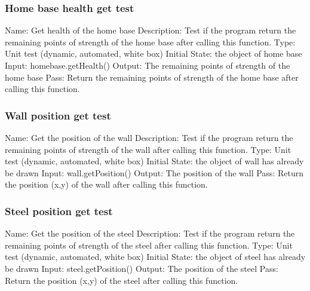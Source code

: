 \documentclass{article}
\begin{document}
\subsubsection{Home base health get test}
Name:  Get health of the home base\newline
Description: Test if the program return the remaining points of strength of the home base after calling this function. \newline
Type: Unit test (dynamic, automated, white box) \newline
Initial State:  the object of home base\newline
Input: homebase.getHealth()\newline
Output: The remaining points of strength of the home base\newline
Pass:  Return the remaining points of strength of the home base after calling this function. \newline

\subsubsection{Wall position get test}
Name:  Get the position of the wall\newline
Description: Test if the program return the remaining points of strength of the wall after calling this function. \newline
Type: Unit test (dynamic, automated, white box) \newline
Initial State:  the object of wall has already be drawn\newline
Input: wall.getPosition()\newline
Output: The position of the wall\newline
Pass:  Return the position (x,y) of the wall after calling this function. \newline

\subsubsection{Steel position get test}
Name:  Get the position of the steel\newline
Description: Test if the program return the remaining points of strength of the steel after calling this function. \newline
Type: Unit test (dynamic, automated, white box) \newline
Initial State:  the object of steel has already be drawn\newline
Input: steel.getPosition()\newline
Output: The position of the steel\newline
Pass:  Return the position (x,y) of the steel after calling this function. \newline
\end{document}
